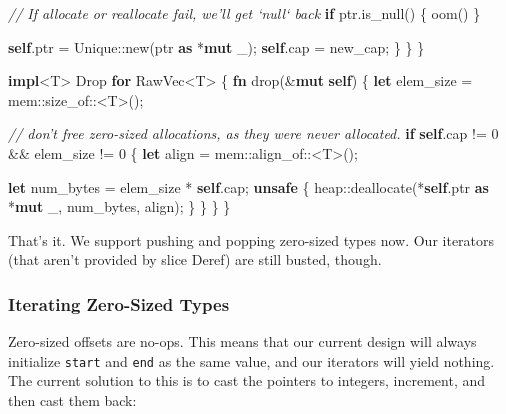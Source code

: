 \documentclass[a4paper,]{book}
\newenvironment{Shaded}{\begin{snugshade}}{\end{snugshade}}
\newcommand{\KeywordTok}[1]{\textcolor[rgb]{0.13,0.29,0.53}{\textbf{{#1}}}}
\newcommand{\DecValTok}[1]{\textcolor[rgb]{0.00,0.00,0.81}{{#1}}}
\newcommand{\CommentTok}[1]{\textcolor[rgb]{0.56,0.35,0.01}{\textit{{#1}}}}
\newcommand{\BuiltInTok}[1]{{#1}}
\newcommand{\NormalTok}[1]{{#1}}
\begin{document}
\begin{Shaded}
\begin{Highlighting}[]
            \CommentTok{// If allocate or reallocate fail, we'll get `null` back}
            \KeywordTok{if} \NormalTok{ptr.is_null() \{ oom() \}}

            \KeywordTok{self}\NormalTok{.ptr = Unique::new(ptr }\KeywordTok{as} \NormalTok{*}\KeywordTok{mut} \NormalTok{_);}
            \KeywordTok{self}\NormalTok{.cap = new_cap;}
        \NormalTok{\}}
    \NormalTok{\}}
\NormalTok{\}}

\KeywordTok{impl}\NormalTok{<T> }\BuiltInTok{Drop} \KeywordTok{for} \NormalTok{RawVec<T> \{}
    \KeywordTok{fn} \NormalTok{drop(&}\KeywordTok{mut} \KeywordTok{self}\NormalTok{) \{}
        \KeywordTok{let} \NormalTok{elem_size = mem::size_of::<T>();}

        \CommentTok{// don't free zero-sized allocations, as they were never allocated.}
        \KeywordTok{if} \KeywordTok{self}\NormalTok{.cap != }\DecValTok{0} \NormalTok{&& elem_size != }\DecValTok{0} \NormalTok{\{}
            \KeywordTok{let} \NormalTok{align = mem::align_of::<T>();}

            \KeywordTok{let} \NormalTok{num_bytes = elem_size * }\KeywordTok{self}\NormalTok{.cap;}
            \KeywordTok{unsafe} \NormalTok{\{}
                \NormalTok{heap::deallocate(*}\KeywordTok{self}\NormalTok{.ptr }\KeywordTok{as} \NormalTok{*}\KeywordTok{mut} \NormalTok{_, num_bytes, align);}
            \NormalTok{\}}
        \NormalTok{\}}
    \NormalTok{\}}
\NormalTok{\}}
\end{Highlighting}
\end{Shaded}

That's it. We support pushing and popping zero-sized types now. Our
iterators (that aren't provided by slice Deref) are still busted,
though.

\subsubsection{Iterating Zero-Sized
Types}\label{iterating-zero-sized-types}

Zero-sized offsets are no-ops. This means that our current design will
always initialize \texttt{start} and \texttt{end} as the same value, and
our iterators will yield nothing. The current solution to this is to
cast the pointers to integers, increment, and then cast them back:
\end{document}
